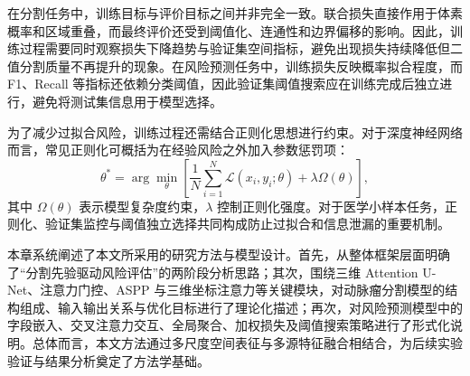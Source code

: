 在分割任务中，训练目标与评价目标之间并非完全一致。联合损失直接作用于体素概率和区域重叠，而最终评价还受到阈值化、连通性和边界偏移的影响。因此，训练过程需要同时观察损失下降趋势与验证集空间指标，避免出现损失持续降低但二值分割质量不再提升的现象。在风险预测任务中，训练损失反映概率拟合程度，而 F1、Recall 等指标还依赖分类阈值，因此验证集阈值搜索应在训练完成后独立进行，避免将测试集信息用于模型选择。

为了减少过拟合风险，训练过程还需结合正则化思想进行约束。对于深度神经网络而言，常见正则化可概括为在经验风险之外加入参数惩罚项：
\begin{equation}
\theta^{\ast}=\arg\min_{\theta}\left[\frac{1}{N}\sum_{i=1}^{N}\mathcal{L}(x_i,y_i;\theta)+\lambda\Omega(\theta)\right],
\end{equation}
其中 $\Omega(\theta)$ 表示模型复杂度约束，$\lambda$ 控制正则化强度。对于医学小样本任务，正则化、验证集监控与阈值独立选择共同构成防止过拟合和信息泄漏的重要机制。

本章系统阐述了本文所采用的研究方法与模型设计。首先，从整体框架层面明确了“分割先验驱动风险评估”的两阶段分析思路；其次，围绕三维 Attention U-Net、注意力门控、ASPP 与三维坐标注意力等关键模块，对动脉瘤分割模型的结构组成、输入输出关系与优化目标进行了理论化描述；再次，对风险预测模型中的字段嵌入、交叉注意力交互、全局聚合、加权损失及阈值搜索策略进行了形式化说明。总体而言，本文方法通过多尺度空间表征与多源特征融合相结合，为后续实验验证与结果分析奠定了方法学基础。